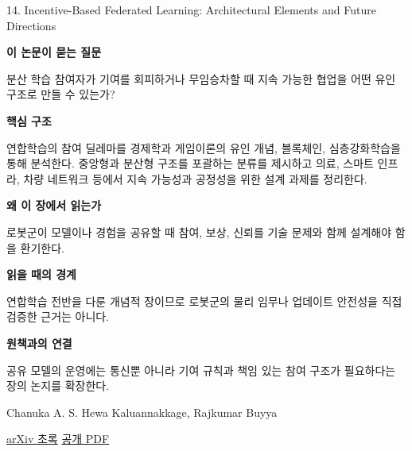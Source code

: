 \documentclass[11pt,openany]{book}
\begin{document}
\begin{termcard}{14. Incentive-Based Federated Learning: Architectural Elements and Future Directions}

\par

\medskip

{\sffamily\bfseries\color{deepblue} 이 논문이 묻는 질문}\par

분산 학습 참여자가 기여를 회피하거나 무임승차할 때 지속 가능한 협업을 어떤 유인 구조로 만들 수 있는가?

\smallskip

{\sffamily\bfseries\color{deepblue} 핵심 구조}\par

연합학습의 참여 딜레마를 경제학과 게임이론의 유인 개념, 블록체인, 심층강화학습을 통해 분석한다. 중앙형과 분산형 구조를 포괄하는 분류를 제시하고 의료, 스마트 인프라, 차량 네트워크 등에서 지속 가능성과 공정성을 위한 설계 과제를 정리한다.

\smallskip

{\sffamily\bfseries\color{deepblue} 왜 이 장에서 읽는가}\par

로봇군이 모델이나 경험을 공유할 때 참여, 보상, 신뢰를 기술 문제와 함께 설계해야 함을 환기한다.

\smallskip

{\sffamily\bfseries\color{coral} 읽을 때의 경계}\par

연합학습 전반을 다룬 개념적 장이므로 로봇군의 물리 임무나 업데이트 안전성을 직접 검증한 근거는 아니다.

\smallskip

{\sffamily\bfseries\color{teal} 원책과의 연결}\par

공유 모델의 운영에는 통신뿐 아니라 기여 규칙과 책임 있는 참여 구조가 필요하다는 장의 논지를 확장한다.

\medskip

{\footnotesize\color{muted} Chanuka A. S. Hewa Kaluannakkage, Rajkumar Buyya\par

\href{https://arxiv.org/abs/2510.14208}{arXiv 초록} \quad \href{https://arxiv.org/pdf/2510.14208}{공개 PDF}\par}

\end{termcard}
\end{document}
